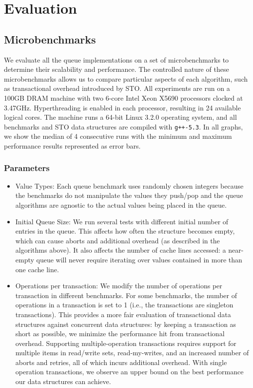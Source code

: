 \section{Evaluation}

\subsection{Microbenchmarks}
\label{q_microbenchmarks}

We evaluate all the queue implementations on a set of microbenchmarks to determine their scalability and performance. The controlled nature of these microbenchmarks allows us to compare particular aspects of each algorithm, such as transactional overhead introduced by STO. All experiments are run on a 100GB DRAM machine with two 6-core Intel Xeon X5690 processors clocked at 3.47GHz. Hyperthreading is enabled in each processor, resulting in 24 available logical cores. The machine runs a 64-bit Linux 3.2.0 operating system, and all benchmarks and STO data structures are compiled with \texttt{g++-5.3}. In all graphs, we show the median of 4 consecutive runs with the minimum and maximum performance results represented as error bars.

\subsubsection{Parameters}

\begin{itemize}
\item Value Types: Each queue benchmark uses randomly chosen integers because the benchmarks do not manipulate the values they push/pop and the queue algorithms are agnostic to the actual values being placed in the queue.

\item Initial Queue Size: We run several tests with different initial number of entries in the queue. This affects how often the structure becomes empty, which can cause aborts and additional overhead (as described in the algorithms above). It also affects the number of cache lines accessed: a near-empty queue will never require iterating over values contained in more than one cache line.

\item Operations per transaction: We modify the number of operations per transaction in different benchmarks. For some benchmarks, the number of operations in a transaction is set to 1 (i.e., the transactions are singleton transactions). This provides a more fair evaluation of transactional data structures against concurrent data structures: by keeping a transaction as short as possible, we minimize the performance hit from transactional overhead. Supporting multiple-operation transactions requires support for multiple items in read/write sets, read-my-writes, and an increased number of aborts and retries, all of which incurs additional overhead. With single operation transactions, we observe an upper bound on the best performance our data structures can achieve.

\end{itemize}

